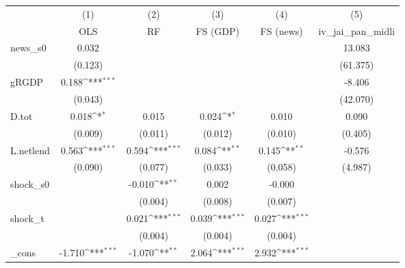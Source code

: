 {
\def\sym#1{\ifmmode^{#1}\else\(^{#1}\)\fi}
\begin{tabular}{l*{5}{c}}
\toprule
            &\multicolumn{1}{c}{(1)}&\multicolumn{1}{c}{(2)}&\multicolumn{1}{c}{(3)}&\multicolumn{1}{c}{(4)}&\multicolumn{1}{c}{(5)}\\
            &\multicolumn{1}{c}{OLS}&\multicolumn{1}{c}{RF}&\multicolumn{1}{c}{FS (GDP)}&\multicolumn{1}{c}{FS (news)}&\multicolumn{1}{c}{iv\_jai\_pan\_midli}\\
\midrule
news\_s0     &       0.032         &                     &                     &                     &      13.083         \\
            &     (0.123)         &                     &                     &                     &    (61.375)         \\
\addlinespace
gRGDP       &       0.188\sym{***}&                     &                     &                     &      -8.406         \\
            &     (0.043)         &                     &                     &                     &    (42.070)         \\
\addlinespace
D.tot       &       0.018\sym{*}  &       0.015         &       0.024\sym{*}  &       0.010         &       0.090         \\
            &     (0.009)         &     (0.011)         &     (0.012)         &     (0.010)         &     (0.405)         \\
\addlinespace
L.netlend   &       0.563\sym{***}&       0.594\sym{***}&       0.084\sym{**} &       0.145\sym{**} &      -0.576         \\
            &     (0.090)         &     (0.077)         &     (0.033)         &     (0.058)         &     (4.987)         \\
\addlinespace
shock\_s0    &                     &      -0.010\sym{**} &       0.002         &      -0.000         &                     \\
            &                     &     (0.004)         &     (0.008)         &     (0.007)         &                     \\
\addlinespace
shock\_t     &                     &       0.021\sym{***}&       0.039\sym{***}&       0.027\sym{***}&                     \\
            &                     &     (0.004)         &     (0.004)         &     (0.004)         &                     \\
\addlinespace
\_cons      &      -1.710\sym{***}&      -1.070\sym{**} &       2.064\sym{***}&       2.932\sym{***}&                     \\

\end{tabular}}
